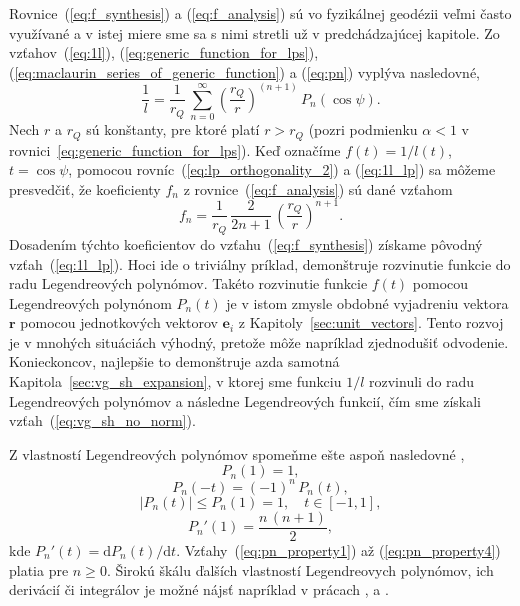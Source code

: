 \documentclass[a4paper, 12pt]{book}
\newcommand{\diff}{\mathrm d}
\let\vec\mathbf
\begin{document}
Rovnice~(\ref{eq:f_synthesis}) a (\ref{eq:f_analysis}) sú vo fyzikálnej 
geodézii veľmi často využívané a  v istej miere sme sa s nimi stretli už 
v predchádzajúcej kapitole.  Zo vzťahov~(\ref{eq:1l}), 
(\ref{eq:generic_function_for_lps}), 
(\ref{eq:maclaurin_series_of_generic_function}) a (\ref{eq:pn}) vyplýva 
nasledovné,
%
\begin{equation}
\label{eq:1l_lp}
\frac{1}{l} = \frac{1}{r_Q} \, \sum_{n = 0}^\infty \left( \frac{r_Q}{r} 
\right)^{(n + 1)} \, P_n(\cos\psi){.}
\end{equation}
%
Nech $r$ a $r_Q$ sú konštanty, pre ktoré platí $r > r_Q$ (pozri podmienku 
$\alpha < 1$ v rovnici~\ref{eq:generic_function_for_lps}).  Keď označíme $f(t) 
= 1 \slash l(t)$, $t = \cos\psi$, pomocou rovníc~(\ref{eq:lp_orthogonality_2}) 
a (\ref{eq:1l_lp}) sa môžeme presvedčiť, že koeficienty $f_n$ 
z rovnice~(\ref{eq:f_analysis}) sú dané vzťahom
%
\begin{equation}
f_n = \frac{1}{r_Q} \, \frac{2}{2n + 1} \, \left( \frac{r_Q}{r} \right)^{n 
+ 1}{.}
\end{equation}
%
Dosadením týchto koeficientov do vzťahu~(\ref{eq:f_synthesis}) získame pôvodný 
vzťah~(\ref{eq:1l_lp}).  Hoci ide o triviálny príklad, demonštruje rozvinutie 
funkcie do radu Legendreových polynómov.  Takéto rozvinutie funkcie $f(t)$ 
pomocou Legendreových polynónom $P_n(t)$ je v istom zmysle obdobné vyjadreniu 
vektora $\vec r$ pomocou jednotkových vektorov $\vec e_i$ 
z Kapitoly~\ref{sec:unit_vectors}.  Tento rozvoj je v mnohých situáciách 
výhodný, pretože môže napríklad zjednodušiť odvodenie.  Konieckoncov, najlepšie 
to demonštruje azda samotná Kapitola~\ref{sec:vg_sh_expansion}, v ktorej sme 
funkciu $1 \slash l$ rozvinuli do radu Legendreových polynómov a následne 
Legendreových funkcií, čím sme získali vzťah~(\ref{eq:vg_sh_no_norm}).

Z vlastností Legendreových polynómov spomeňme ešte aspoň nasledovné
\citep{Freeden2009},
%
\begin{equation}
\label{eq:pn_property1}
P_n(1) = 1{,}
\end{equation}
%
\begin{equation}
\label{eq:pn_property2}
P_n(-t) = (-1)^n \, P_n(t){,}
\end{equation}
%
\begin{equation}
\label{eq:pn_property3}
|P_n(t)| \leq P_n(1) = 1{,} \quad t \in [-1, 1]{,}
\end{equation}
%
\begin{equation}
\label{eq:pn_property4}
P_n'(1) = \frac{n \, (n + 1)}{2}{,}
\end{equation}
%
kde $P_n'(t) = \diff P_n(t) \slash \diff t$.  Vzťahy~(\ref{eq:pn_property1}) až 
(\ref{eq:pn_property4}) platia pre $n \geq 0$.   Širokú škálu ďalších 
vlastností Legendreovych polynómov, ich derivácií či integrálov je možné nájsť 
napríklad v prácach \cite{Gradshteyn2007}, \cite{Freeden2009} 
a \cite{Olver2010}.
\end{document}
